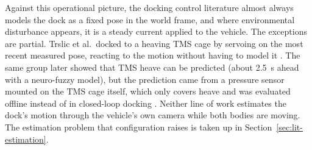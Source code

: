 Against this operational picture, the docking control literature almost always models the dock as a fixed pose in the world frame, and where environmental disturbance appears, it is a steady current applied to the vehicle. The exceptions are partial. Trslic et al.\ docked to a heaving TMS cage by servoing on the most recent measured pose, reacting to the motion without having to model it \cite{trslic2020vision}. The same group later showed that TMS heave can be predicted (about 2.5~s ahead with a neuro-fuzzy model), but the prediction came from a pressure sensor mounted on the TMS cage itself, which only covers heave and was evaluated offline instead of in closed-loop docking \cite{trslic2020neuro}. Neither line of work estimates the dock's motion through the vehicle's own camera while both bodies are moving. The estimation problem that configuration raises is taken up in Section~\ref{sec:lit-estimation}.

